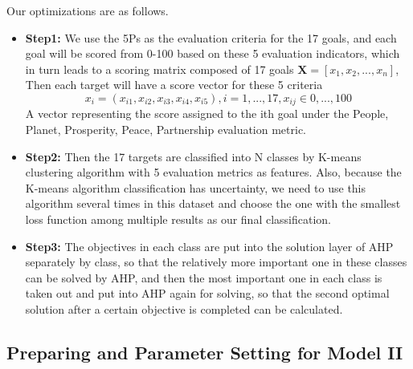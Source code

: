 Our optimizations are as follows.
\begin{itemize}
    \item \textbf{Step1:} We use the 5Ps as the evaluation criteria for the 17 goals, and each goal will be scored from 0-100 based on these 5 evaluation indicators, which in turn leads to a scoring matrix composed of 17 goals %
    $\mathbf{X}=[x_1,x_2,...,x_n]$, Then each target will have a score vector for these 5 criteria
    \begin{equation}
        x_i=(x_{i1},x_{i2},x_{i3},x_{i4},x_{i5}),i=1,...,17,x_{ij}\in{0,...,100}
    \end{equation}
    A vector representing the score assigned to the ith goal under the People, Planet, Prosperity, Peace, Partnership evaluation metric.%
    
    \item \textbf{Step2:} Then the 17 targets are classified into N classes by K-means clustering algorithm with 5 evaluation metrics as features. Also, because the K-means algorithm classification has uncertainty, we need to use this algorithm several times in this dataset and choose the one with the smallest loss function among multiple results as our final classification.  %
    
    \item \textbf{Step3:} The objectives in each class are put into the solution layer of AHP separately by class, so that the relatively more important one in these classes can be solved by AHP, and then the most important one in each class is taken out and put into AHP again for solving, so that the second optimal solution after a certain objective is completed can be calculated. %
\end{itemize}

\subsection{Preparing and Parameter Setting for Model II}



